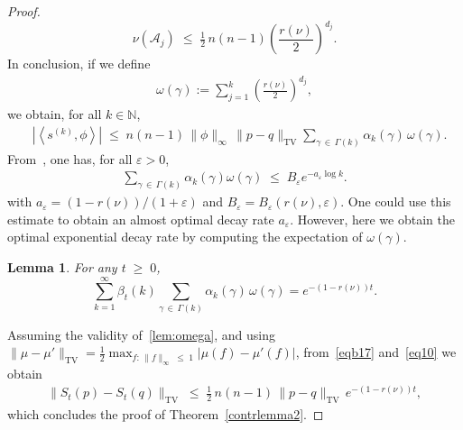\documentclass[10pt,a4paper]{article}
\newtheorem{lemm}[theorem]{Lemma}
\renewcommand{\leq}{\;\leqslant\;}
\renewcommand{\geq}{\;\geqslant\;}
\newcommand{\e}{\varepsilon}
\newcommand{\tv}{\mathrm{TV}}
\newcommand{\cA}{\mathcal{A}}
\newcommand{\bbN}{\mathbb{N}}
\let\b=\beta
\let\e=\varepsilon
\let\g=\gamma
\let\o=\omega
\begin{document}
\begin{proof}
\[
\nu(\cA_j)\leq \tfrac12\,n(n-1)\left(\frac{r(\nu)}{2}\right)^{d_j}.
\]
In conclusion, if we define
\begin{align}\label{eqomegagamma}
\o(\gamma):=\sum_{j=1}^k\left(\frac{r(\nu)}{2}\right)^{d_j},
\end{align}
we obtain, for all $k\in\bbN$,
\begin{align}\label{eq10}
& \left|\left\langle s^{(k)},\phi\right\rangle\right|\leq{n(n-1)}\,\|\phi\|_\infty\,\|p-q\|_\tv \sum_{\gamma\,\in\,\Gamma(k)}\alpha_k(\gamma)
\,\o(\g).
\end{align}
From~\cite[Lemma~1.4]{carlenwild}, one has, for all $\e>0$,
\begin{align}\label{carlenwildestimation}
\sum_{\gamma\,\in\,\Gamma(k)}\alpha_k(\gamma)\o(\gamma) \leq B_\e e^{-a_\e\log k}.
\end{align}
with $a_\e=(1-r(\nu))/(1+\e)$ and $B_\e=B_\e(r(\nu),\e)$. One could use this estimate to obtain an almost optimal decay rate $a_\e$. However, here we obtain the optimal exponential decay rate by computing the expectation of $\o(\g)$.

\begin{lemm}\label{lemma:omega}
For any $t\geq 0$,
\begin{equation}\label{lem:omega}
\sum_{k=1}^{\infty}\b_t(k)\sum_{\g\,\in \,\Gamma(k)}\alpha_k(\g)\,\o(\gamma) = e^{-(1-r(\nu))t}.
\end{equation}
\end{lemm}

Assuming the validity of~\eqref{lem:omega}, and using $\|\mu-\mu'\|_\tv = \tfrac12 \max_{f:\,\|f\|_\infty\leq 1} |\mu(f)-\mu'(f)|$, from~\eqref{eqb17} and~\eqref{eq10} we obtain
\begin{align}\label{eqabb17}
\|S_t(p) - S_t(q)\|_\tv
\leq \tfrac12\,n(n-1)\,\|p-q\|_\tv \,e^{-(1-r(\nu))t},
\end{align}
which concludes the proof of Theorem~\ref{contrlemma2}.


\end{proof}
\end{document}
